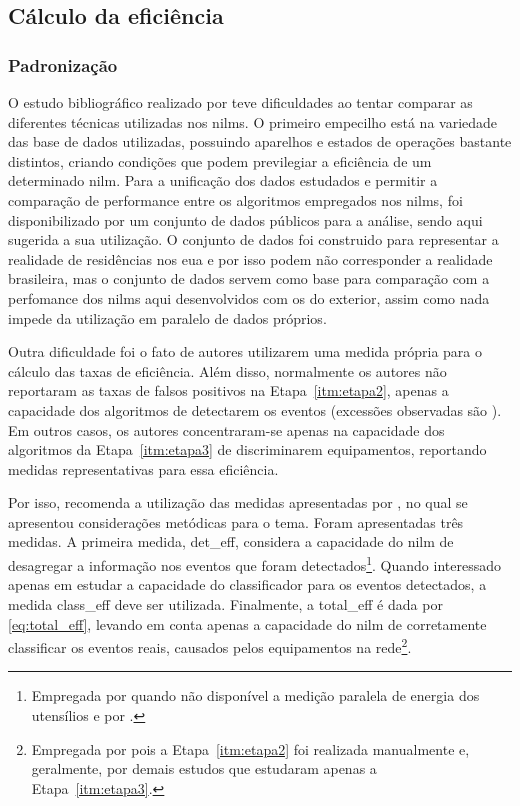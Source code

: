 \subsection{Cálculo da eficiência}
\label{ssec:nilm_eff_calc}

\subsubsection{Padronização}
\label{top:nilm_padrao}

O estudo bibliográfico realizado por \cite{nilm_zeifman_review_2011}
teve dificuldades ao tentar comparar as diferentes técnicas utilizadas
nos \glspl{nilm}. O primeiro empecilho está na variedade das base
de dados utilizadas, possuindo aparelhos e estados de operações
bastante distintos, criando condições que podem previlegiar a
eficiência de um determinado \gls{nilm}. Para a unificação dos dados
estudados e permitir a comparação de performance entre os algoritmos
empregados nos \glspl{nilm}, foi disponibilizado por
\cite{nilm_dataset_blued_2012} um conjunto de dados públicos para
a análise, sendo aqui sugerida a sua utilização. O conjunto de dados
foi construido para representar a realidade de residências nos
\gls{eua} e por isso podem não corresponder a realidade brasileira,
mas o conjunto de dados servem como base para comparação com a
perfomance dos \glspl{nilm} aqui desenvolvidos com os do exterior,
assim como nada impede da utilização em paralelo de dados próprios.

Outra dificuldade foi o fato de autores utilizarem uma
medida própria para o cálculo das taxas de eficiência.  Além disso,
normalmente os autores não reportaram as taxas de falsos positivos na
Etapa~\ref{itm:etapa2}, apenas a capacidade dos algoritmos de
detectarem os eventos (excessões observadas são
\cite{nilm_marceau_16ssamp_improved_1999_18,nilm_liang_pt2_2010_40}).
Em outros casos, os autores concentraram-se apenas na capacidade dos
algoritmos da Etapa~\ref{itm:etapa3} de discriminarem equipamentos,
reportando medidas representativas para essa eficiência.

Por isso, \cite{nilm_zeifman_review_2011} recomenda a utilização das
medidas apresentadas por \cite{nilm_liang_pt1_2010_34}, no qual se
apresentou considerações metódicas para o tema. Foram apresentadas
três medidas. A primeira medida, \gls{det_eff}, considera a
capacidade do \gls{nilm} de desagregar a informação nos eventos que
foram detectados\footnote{Empregada por \cite{nilm_hart_1992_8} quando não
disponível a medição paralela de energia dos utensílios e por
\cite{nilm_gupta_patel_2010_30}.}. Quando
interessado apenas em estudar a capacidade do classificador para os
eventos detectados, a medida \gls{class_eff} deve ser 
utilizada. Finalmente, a \gls{total_eff} é
dada por \ref{eq:total_eff}, levando em conta apenas a capacidade do
\gls{nilm} de corretamente classificar os eventos
reais, causados pelos equipamentos na rede\footnote{Empregada por
\cite{nilm_patel_2007_29,nilm_berges_2009_36} pois a
Etapa~\ref{itm:etapa2} foi realizada
manualmente \label{fn:patel_manual} e, geralmente, por demais estudos
que estudaram apenas a Etapa~\ref{itm:etapa3}.}.

